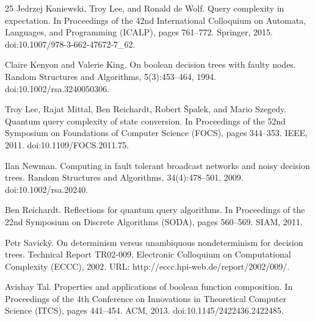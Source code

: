 \documentclass[10pt,a4paper]{article}
\begin{document}
\begin{thebibliography}{25}
Jedrzej Kaniewski, Troy Lee, and Ronald de Wolf. Query complexity in expectation. In Proceedings of the 42nd International Colloquium on Automata, Languages, and Programming (ICALP), pages 761–772. Springer, 2015. doi:10.1007/978-3-662-47672-7\_62.

Claire Kenyon and Valerie King. On boolean decision trees with faulty nodes. Random Structures and Algorithms, 5(3):453–464, 1994. doi:10.1002/rsa.3240050306.

Troy Lee, Rajat Mittal, Ben Reichardt, Robert Špalek, and Mario Szegedy. Quantum query complexity of state conversion. In Proceedings of the 52nd Symposium on Foundations of Computer Science (FOCS), pages 344–353. IEEE, 2011. doi:10.1109/FOCS.2011.75.

Ilan Newman. Computing in fault tolerant broadcast networks and noisy decision trees. Random Structures and Algorithms, 34(4):478–501, 2009. doi:10.1002/rsa.20240.

Ben Reichardt. Reflections for quantum query algorithms. In Proceedings of the 22nd Symposium on Discrete Algorithms (SODA), pages 560–569. SIAM, 2011.

Petr Savický. On determinism versus unambiquous nondeterminism for decision trees. Technical Report TR02-009, Electronic Colloquium on Computational Complexity (ECCC), 2002. URL: http://eccc.hpi-web.de/report/2002/009/.

Avishay Tal. Properties and applications of boolean function composition. In Proceedings of the 4th Conference on Innovations in Theoretical Computer Science (ITCS), pages 441–454. ACM, 2013. doi:10.1145/2422436.2422485.
\end{thebibliography}
\end{document}
